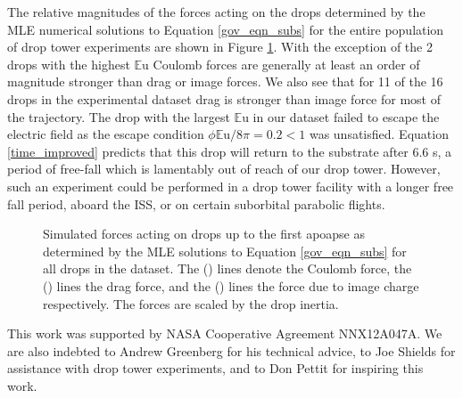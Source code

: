 \documentclass[aip,reprint, floatfix]{revtex4-1}
\begin{document}
The relative magnitudes of the forces acting on the drops determined by the MLE numerical solutions to Equation \ref{gov_eqn_subs} for the entire population of drop tower experiments are shown in Figure \ref{fig:forces}. With the exception of the 2 drops with the highest $\mathbb{E}\mbox{u}$ Coulomb forces are generally at least an order of magnitude stronger than drag or image forces. We also see that for 11 of the 16 drops in the experimental dataset drag is stronger than image force for most of the trajectory. The drop with the largest $\mathbb{E}\mbox{u}$ in our dataset failed to escape the electric field as the escape condition $\phi \mathbb{E}\mbox{u} / 8\pi = 0.2 < 1$ was unsatisfied. Equation \ref{time_improved} predicts that this drop will return to the substrate after 6.6 s, a period of free-fall which is lamentably out of reach of our drop tower. However, such an experiment could be performed in a drop tower facility with a longer free fall period, aboard the ISS, or on certain suborbital parabolic flights.
\begin{figure}[!htb]
    \centering
    \resizebox{0.5\textwidth}{!}{}
    \caption{Simulated forces acting on drops up to the first apoapse as determined by the MLE solutions to Equation \ref{gov_eqn_subs} for all drops in the dataset. The (\protect\redline) lines denote the Coulomb force, the (\protect\blueline) lines the drag force, and the (\protect\cyanline) lines the force due to image charge respectively. The forces are scaled by the drop inertia.\label{fig:forces}}
\end{figure}

\begin{acknowledgments}
This work was supported by NASA Cooperative Agreement NNX12A047A. We are also indebted to Andrew Greenberg for his technical advice, to Joe Shields for assistance with drop tower experiments, and to Don Pettit for inspiring this work.
\end{acknowledgments}


%
%
\end{document}
